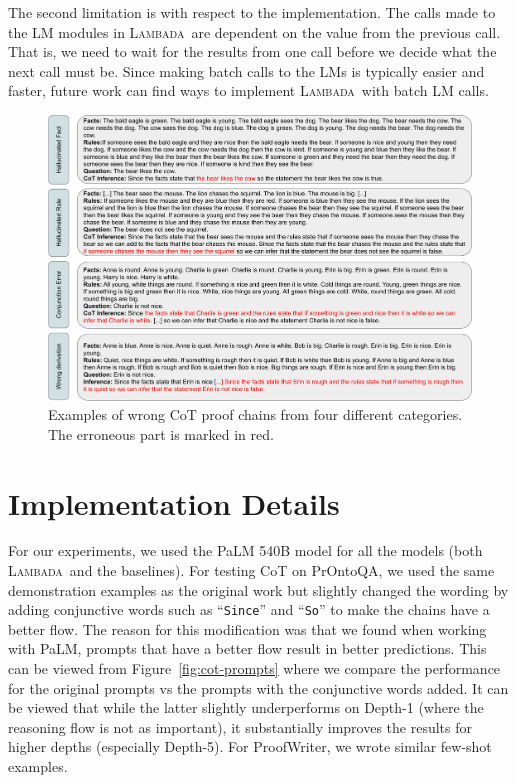 \documentclass[11pt]{article}
\newcommand{\algo}{\textsc{Lambada}}
\begin{document}
The second limitation is with respect to the implementation. The calls made to the LM modules in \algo\ are dependent on the value from the previous call. That is, we need to wait for the results from one call before we decide what the next call must be. Since making batch calls to the LMs is typically easier and faster, future work can find ways to implement \algo\ with batch LM calls.

\begin{figure}[t]
  \centering
  \includegraphics[width=\textwidth]{cot_failure.pdf}
  \caption{%
  \label{fig:cot-failures} %
    Examples of wrong CoT proof chains from four different categories. The erroneous part is marked in red. 
  }
\end{figure}

\section{Implementation Details} \label{sec:impl_details}
For our experiments, we used the PaLM 540B model \cite{chowdhery2022palm} for all the models (both \algo\ and the baselines). For testing CoT on PrOntoQA, we used the same demonstration examples as the original work but slightly changed the wording by adding conjunctive words such as ``\texttt{Since}'' and ``\texttt{So}'' to make the chains have a better flow. The reason for this modification was that we found when working with PaLM, prompts that have a better flow result in better predictions. This can be viewed from Figure~\ref{fig:cot-prompts} where we compare the performance for the original prompts vs the prompts with the conjunctive words added. It can be viewed that while the latter slightly underperforms on Depth-1 (where the reasoning flow is not as important), it substantially improves the results for higher depths (especially Depth-5). For ProofWriter, we wrote similar few-shot examples. 
\end{document}
